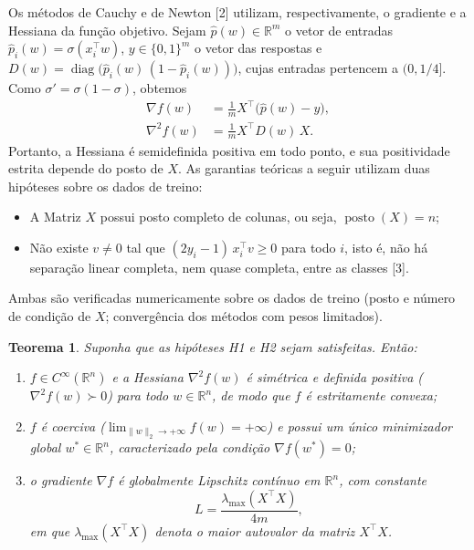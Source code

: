 \documentclass{article}
\newtheorem{theorem}{Teorema}
\theoremstyle{remark}
\begin{document}
Os métodos de Cauchy e de Newton [2] utilizam, respectivamente, o gradiente e a Hessiana da função objetivo. Sejam $\hat p(w) \in \mathbb{R}^m$ o vetor de entradas $\hat p_i(w) = \sigma(x_i^\top w)$, $y \in \{0,1\}^m$ o vetor das respostas e $D(w) = \operatorname{diag}\big(\hat p_i(w)\,(1 - \hat p_i(w))\big)$, cujas entradas pertencem a $(0, 1/4]$. Como $\sigma' = \sigma(1 - \sigma)$, obtemos
\begin{align}
\nabla f(w) &= \frac{1}{m} X^\top \big( \hat p(w) - y \big), \label{eq:grad} \\
\nabla^2 f(w) &= \frac{1}{m} X^\top D(w)\, X. \label{eq:hess}
\end{align}
Portanto, a Hessiana é semidefinida positiva em todo ponto, e sua positividade estrita depende do posto de $X$. As garantias teóricas a seguir utilizam duas hipóteses sobre os dados de treino:
\begin{itemize}
\item[(H1)] A Matriz $\mathit{X}$ possui posto completo de colunas, ou seja, $\operatorname{posto}(X) = n$;
\item[(H2)] Não existe $v \neq 0$ tal que $(2y_i - 1)\, x_i^\top v \geq 0$ para todo $i$, isto é, não há separação linear completa, nem quase completa, entre as classes [3].
\end{itemize}
Ambas são verificadas numericamente sobre os dados de treino (posto e número de condição de $X$; convergência dos métodos com pesos limitados).

\begin{theorem}
\label{teo:existencia}
Suponha que as hipóteses H1 e H2 sejam satisfeitas. Então:
\begin{enumerate}[label=(\roman*)]
    \item $f \in C^{\infty}(\mathbb{R}^n)$ e a Hessiana $\nabla^2 f(w)$ é simétrica e definida positiva ($\nabla^2 f(w) \succ 0$) para todo $w \in \mathbb{R}^n$, de modo que $f$ é estritamente convexa;
    \item $f$ é coerciva ($\lim_{\|w\|_2 \to +\infty} f(w) = +\infty$) e possui um único minimizador global $w^* \in \mathbb{R}^n$, caracterizado pela condição $\nabla f(w^*) = 0$;
    \item o gradiente $\nabla f$ é globalmente Lipschitz contínuo em $\mathbb{R}^n$, com constante
    \[
    L = \frac{\lambda_{\max}(X^{\top}X)}{4m},
    \]
    em que $\lambda_{\max}(X^{\top}X)$ denota o maior autovalor da matriz $X^{\top}X$. \\
\end{enumerate}
\end{theorem} 
\end{document}
